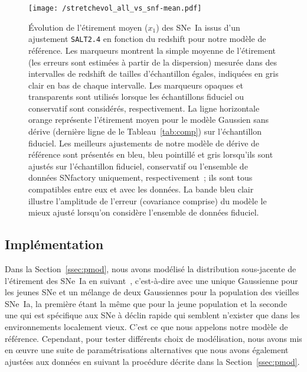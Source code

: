 \documentclass[../main/main.tex]{subfiles}
\begin{document}
\begin{figure*}
    \centering
    \texttt{[image: /stretchevol\_all\_vs\_snf-mean.pdf]}
    \caption[Évolution de l'étirement moyen des SNe~Ia en fonction du redshift
    issu de la prédiction de notre modèle de référence selon l'échantillon
    utilisé.]{Évolution de l'étirement moyen ($x_1$) des SNe~Ia issus d'un
        ajustement \texttt{SALT2.4} en fonction du redshift pour notre modèle de
        référence. Les marqueurs montrent la simple moyenne de l'étirement (les
        erreurs sont estimées à partir de la dispersion) mesurée dans des
        intervalles de redshift de tailles d'échantillon égales, indiquées en
        gris clair en bas de chaque intervalle. Les marqueurs opaques et
        transparents sont utilisés lorsque les échantillons fiduciel ou
        conservatif sont considérés, respectivement. La ligne horizontale orange
        représente l'étirement moyen pour le modèle Gaussien sans dérive
        (dernière ligne de le Tableau~\ref{tab:comp}) sur l'échantillon fiduciel.
        Les meilleurs ajustements de notre modèle de dérive de référence sont
        présentés en bleu, bleu pointillé et gris lorsqu'ils sont ajustés sur
        l'échantillon fiduciel, conservatif ou l'ensemble de données SNfactory
        uniquement, respectivement~; ils sont tous compatibles entre eux et avec
        les données. La bande bleu clair illustre l'amplitude de l'erreur
        (covariance comprise) du modèle le mieux ajusté lorsqu'on considère
    l'ensemble de données fiduciel.}
    \label{fig:modelall}
\end{figure*}

\subsection{Implémentation}\label{ssec:modimpl}

Dans la Section~\ref{ssec:pmod}, nous avons modélisé la distribution
sous-jacente de l'étirement des SNe~Ia en suivant~\cite{rigault2020},
c'est-à-dire avec une unique Gaussienne pour les jeunes SNe et un mélange de
deux Gaussiennes pour la population des vieilles SNe~Ia, la première étant la
même que pour la jeune population et la seconde une qui est spécifique aux SNe à
déclin rapide qui semblent n'exister que dans les environnements localement
vieux. C'est ce que nous appelons notre modèle de référence. Cependant, pour
tester différents choix de modélisation, nous avons mis en œuvre une suite de
paramétrisations alternatives que nous avons également ajustées aux données en
suivant la procédure décrite dans la Section~\ref{ssec:pmod}.
\end{document}
